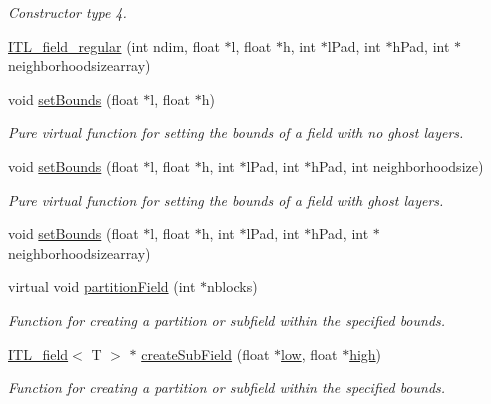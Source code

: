 \begin{DoxyCompactItemize}
\begin{DoxyCompactList}\small\item\em Constructor type 4. \item\end{DoxyCompactList}\item 
\hyperlink{classITL__field__regular_aeabd017636d10eababa418b8cfa8765c}{ITL\_\-field\_\-regular} (int ndim, float $\ast$l, float $\ast$h, int $\ast$lPad, int $\ast$hPad, int $\ast$neighborhoodsizearray)
\item 
void \hyperlink{classITL__field__regular_a96d8e5cc41ae4e63671d43764056d161}{setBounds} (float $\ast$l, float $\ast$h)
\begin{DoxyCompactList}\small\item\em Pure virtual function for setting the bounds of a field with no ghost layers. \item\end{DoxyCompactList}\item 
void \hyperlink{classITL__field__regular_aa7897cdf06b261236e0efdab0987be9f}{setBounds} (float $\ast$l, float $\ast$h, int $\ast$lPad, int $\ast$hPad, int neighborhoodsize)
\begin{DoxyCompactList}\small\item\em Pure virtual function for setting the bounds of a field with ghost layers. \item\end{DoxyCompactList}\item 
void \hyperlink{classITL__field__regular_af208eb6a35d5be3d496ff110f56e62d0}{setBounds} (float $\ast$l, float $\ast$h, int $\ast$lPad, int $\ast$hPad, int $\ast$neighborhoodsizearray)
\item 
virtual void \hyperlink{classITL__field__regular_a0497909739ef494ee78808bbbfeaba0f}{partitionField} (int $\ast$nblocks)
\begin{DoxyCompactList}\small\item\em Function for creating a partition or subfield within the specified bounds. \item\end{DoxyCompactList}\item 
\hyperlink{classITL__field}{ITL\_\-field}$<$ T $>$ $\ast$ \hyperlink{classITL__field__regular_a600a5a99a3e696c3a6698f112933a90c}{createSubField} (float $\ast$\hyperlink{MainIT__regvector_8cpp_abb1e2dad97264e859f3ee8af1341d68c}{low}, float $\ast$\hyperlink{MainIT__regvector_8cpp_a2012a18ba7a98e566c072356d03c4240}{high})
\begin{DoxyCompactList}\small\item\em Function for creating a partition or subfield within the specified bounds. \item\end{DoxyCompactList}\item 

\end{DoxyCompactItemize}
